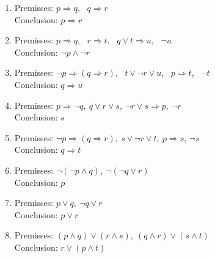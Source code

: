 \begin{enumerate}

\item Premisses: $p \Rightarrow q$, \ $q \Rightarrow r$ \\
      Conclusion: $p \Rightarrow r$
\item Premisses: $p \Rightarrow q$, \ $r \Rightarrow t$, \ $q \vee t \Rightarrow u$, \ $\neg u$ \\
      Conclusion: $\neg p \wedge \neg r$
\item Premisses: $\neg p \Rightarrow (q \Rightarrow r)$, \ $t \vee \neg r \vee u$, \ $p \Rightarrow t$, \ $\neg t$ \\
      Conclusion: $q \Rightarrow u$


\item Premisses: $p \Rightarrow \neg q, \ q \vee r \vee s, \ \neg r \vee s \Rightarrow p, \ \neg r$  \\
			Conclusion: $s$


\item Premisses: $\neg p \Rightarrow (q \Rightarrow r), \ s \vee \neg r \vee t, \ p \Rightarrow s, \ \neg s$ \\
			Conclusion: $q \Rightarrow t$


 \item Premisses: $\neg ( \neg p \wedge q), \ \neg (\neg q \vee r)$ \\
       Conclusion: $p$
 \item Premisses: $p \vee q, \ \neg q \vee r$ \\
       Conclusion: $p \vee r$
 \item Premisses: $(p \wedge q) \vee (r \wedge s), \ (q \wedge r) \vee (s \wedge t)$ \\
       Conclusion: $r \vee (p \wedge t)$

\end{enumerate}

